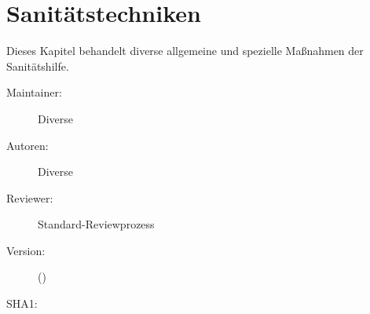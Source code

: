 \def\ChapterCode{SAN}
\chapter
[\CO{[SAN]} Sanitätstechniken]
{Sanitätstechniken}
\label{chp:SAN}

\ChapterIntro
{%
Dieses Kapitel behandelt diverse allgemeine und
spezielle Maßnahmen der Sanitätshilfe. 
}
{%
\begin{description}
  \item[Maintainer:] Diverse
  \item[Autoren:] Diverse
  \item[Reviewer:] Standard-Reviewprozess
  \item[Version:] {\VarDocVersionTypeName} ({\VarDocVersionTypeDescription})
  \item[SHA1:] {\DocGitCommit}
\end{description}

{\TxTeilkapitelAASS}
}



\clearpage %


